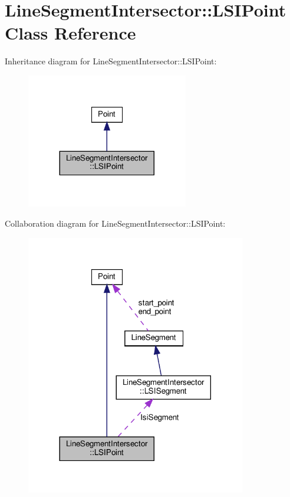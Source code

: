 \hypertarget{classLineSegmentIntersector_1_1LSIPoint}{}\section{Line\+Segment\+Intersector\+:\+:L\+S\+I\+Point Class Reference}
\label{classLineSegmentIntersector_1_1LSIPoint}


Inheritance diagram for Line\+Segment\+Intersector\+:\+:L\+S\+I\+Point\+:
\nopagebreak
\begin{figure}[H]
\begin{center}
\leavevmode
\includegraphics[width=200pt]{classLineSegmentIntersector_1_1LSIPoint__inherit__graph}
\end{center}
\end{figure}


Collaboration diagram for Line\+Segment\+Intersector\+:\+:L\+S\+I\+Point\+:
\nopagebreak
\begin{figure}[H]
\begin{center}
\leavevmode
\includegraphics[width=272pt]{classLineSegmentIntersector_1_1LSIPoint__coll__graph}
\end{center}
\end{figure}

